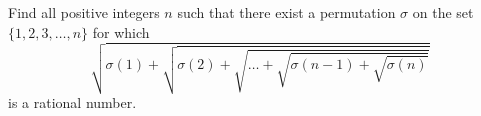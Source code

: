 Find all positive integers $n$ such that there exist a permutation $\sigma$ on the set $\{1,2,3, \ldots, n\}$ for which
\[\sqrt{\sigma(1)+\sqrt{\sigma(2)+\sqrt{\ldots+\sqrt{\sigma(n-1)+\sqrt{\sigma(n)}}}}}\]
is a rational number.